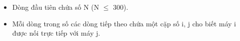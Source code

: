\begin{itemize}
	\item     Dòng đầu tiên chứa số N (N $\le$ 300).   
	\item     Mỗi dòng trong số các dòng tiếp theo chứa một cặp số i, j cho biết máy i được nối trực tiếp với máy j.   
\end{itemize}
